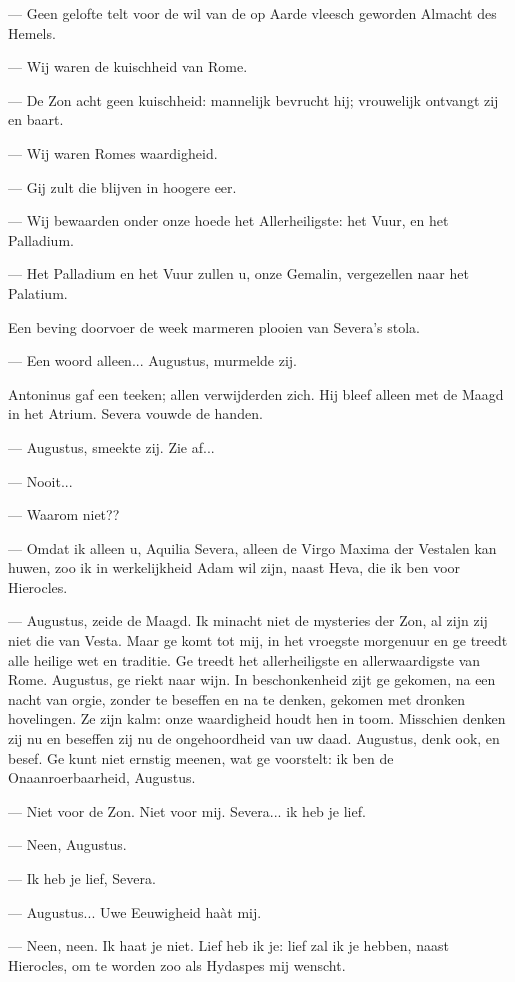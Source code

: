 \documentclass[a4paper, 12pt, oneside, dutch]{article}
\begin{document}
--- Geen gelofte telt voor de wil van de op Aarde vleesch geworden Almacht des Hemels.

--- Wij waren de kuischheid van Rome.

--- De Zon acht geen kuischheid: mannelijk bevrucht hij; vrouwelijk ontvangt zij en baart.

--- Wij waren Romes waardigheid.

--- Gij zult die blijven in hoogere eer.

--- Wij bewaarden onder onze hoede het Allerheiligste: het Vuur, en het Palladium.

--- Het Palladium en het Vuur zullen u, onze Gemalin, vergezellen naar het Palatium.

Een beving doorvoer de week marmeren plooien van Severa's stola.

--- Een woord alleen... Augustus, murmelde zij.

Antoninus gaf een teeken; allen verwijderden zich. Hij bleef alleen met de Maagd in het Atrium. Severa vouwde de handen.

--- Augustus, smeekte zij. Zie af...

--- Nooit...

--- Waarom niet??

--- Omdat ik alleen u, Aquilia Severa, alleen de Virgo Maxima der Vestalen kan huwen, zoo ik in werkelijkheid Adam wil zijn, naast Heva, die ik ben voor Hierocles.

--- Augustus, zeide de Maagd. Ik minacht niet de mysteries der Zon, al zijn zij niet die van Vesta. Maar ge komt tot mij, in het vroegste morgenuur en ge treedt alle heilige wet en traditie. Ge treedt het allerheiligste en allerwaardigste van Rome. Augustus, ge riekt naar wijn. In beschonkenheid zijt ge gekomen, na een nacht van orgie, zonder te beseffen en na te denken, gekomen met dronken hovelingen. Ze zijn kalm: onze waardigheid houdt hen in toom. Misschien denken zij nu en beseffen zij nu de ongehoordheid van uw daad. Augustus, denk ook, en besef. Ge kunt niet ernstig meenen, wat ge voorstelt: ik ben de Onaanroerbaarheid, Augustus.

--- Niet voor de Zon. Niet voor mij. Severa... ik heb je lief.

--- Neen, Augustus.

--- Ik heb je lief, Severa.

--- Augustus... Uwe Eeuwigheid haàt mij.

--- Neen, neen. Ik haat je niet. Lief heb ik je: lief zal ik je hebben, naast Hierocles, om te worden zoo als Hydaspes mij wenscht.
\end{document}
